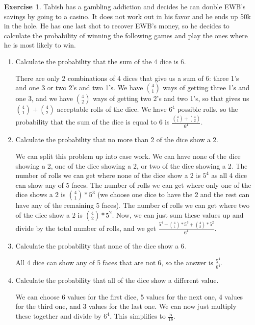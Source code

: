 \documentclass[12pt]{amsart}
\theoremstyle{definition}
\newtheorem{exercise}{Exercise}
\numberwithin{equation}{section}
\theoremstyle{plain}
\begin{document}
\begin{exercise}
Tabish has a gambling addiction and decides he can double EWB's savings by going to a casino. It does not work out in his favor and he ends up 50k in the hole. He has one last shot to recover EWB's money, so he decides to calculate the probability of winning the following games and play the ones where he is most likely to win.
\begin{enumerate}[label=\Alph*.)]
\item Calculate the probability that the sum of the 4 dice is 6. 
\begin{answer}There are only 2 combinations of 4 dices that give us a sum of 6: three 1's and one 3 or two 2's and two 1's. We have $\binom{4}{1}$ ways of getting three 1's and one 3, and we have $\binom{4}{2}$ ways of getting two 2's and two 1's, so that gives us $\binom{4}{1}+\binom{4}{2}$ acceptable rolls of the dice. We have $6^4$ possible rolls, so the probability that the sum of the dice is equal to 6 is $\frac{\binom{4}{1}+\binom{4}{2}}{6^4}$.
\end{answer}
\item Calculate the probability that no more than 2 of the dice show a 2. 
\begin{answer}We can split this problem up into case work. We can have none of the dice showing a 2, one of the dice showing a 2, or two of the dice showing a 2. The number of rolls we can get where none of the dice show a 2 is $5^4$ as all 4 dice can show any of 5 faces. The number of rolls we can get where only one of the dice shows a 2 is $\binom{4}{1}*5^3$ (we choose one dice to have the 2 and the rest can have any of the remaining 5 faces). The number of rolls we can get where two of the dice show a 2 is $\binom{4}{2}*5^2$. Now, we can just sum these values up and divide by the total number of rolls, and we get $\frac{5^4 + \binom{4}{1}*5^3 + \binom{4}{2}*5^2}{6^4}$.
\end{answer}
\item Calculate the probability that none of the dice show a 6.
\begin{answer}
All 4 dice can show any of 5 faces that are not 6, so the answer is $\frac{5^4}{6^4}$.
\end{answer}
\item Calculate the probability that all of the dice show a different value.
\begin{answer}
We can choose 6 values for the first dice, 5 values for the next one, 4 values for the third one, and 3 values for the last one. We can now just multiply these together and divide by $6^4$. This simplifies to $\frac{5}{18}$.

\end{answer}
\end{enumerate}
\end{exercise}
\end{document}
